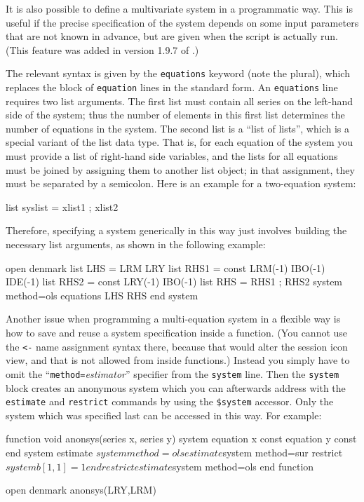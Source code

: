 It is also possible to define a multivariate system in a programmatic
way. This is useful if the precise specification of the system depends
on some input parameters that are not known in advance, but are given
when the script is actually run. (This feature was added in version
1.9.7 of .)

The relevant syntax is given by the \texttt{equations} keyword (note
the plural), which replaces the block of \texttt{equation} lines in
the standard form. An \texttt{equations} line requires two list
arguments. The first list must contain all series on the left-hand
side of the system; thus the number of elements in this first list
determines the number of equations in the system. The second list is a
``list of lists'', which is a special variant of the list data type.
That is, for each equation of the system you must provide a list of
right-hand side variables, and the lists for all equations must be
joined by assigning them to another list object; in that assignment,
they must be separated by a semicolon.  Here is an example for a
two-equation system:

\begin{code}
list syslist = xlist1 ; xlist2
\end{code}

Therefore, specifying a system generically in this way just involves 
building the necessary list arguments, as shown in the following
example:

\begin{code}
open denmark
list LHS = LRM LRY
list RHS1 = const LRM(-1) IBO(-1) IDE(-1)
list RHS2 = const LRY(-1) IBO(-1)
list RHS = RHS1 ; RHS2
system method=ols
     equations LHS RHS
end system
\end{code}

Another issue when programming a multi-equation system in a flexible
way is how to save and reuse a system specification inside a function.
(You cannot use the \verb|<-| name assignment syntax there, because
that would alter the session icon view, and that is not allowed from
inside functions.) Instead you simply have to omit the
``\texttt{method=}\textsl{estimator}'' specifier from the
\texttt{system} line. Then the \texttt{system} block creates an
anonymous system which you can afterwards address with the
\texttt{estimate} and \texttt{restrict} commands by using the
\verb|$system| accessor. Only the system which was specified last can
be accessed in this way. For example:

\begin{code}
function void anonsys(series x, series y)
     system
         equation x const
         equation y const
     end system
     estimate $system method=ols
     estimate $system method=sur
     restrict $system
         b[1,1]=1
     end restrict
     estimate $system method=ols
end function

open denmark
anonsys(LRY,LRM)
\end{code}


